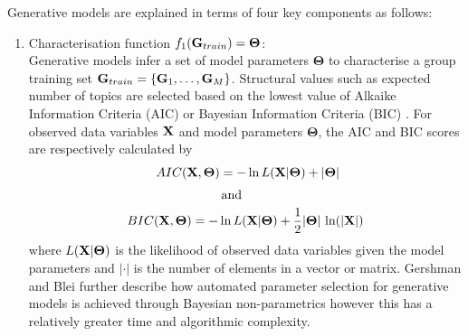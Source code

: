 Generative models are explained in terms of four key components as follows: %
\begin{enumerate}[1.]

\item Characterisation function $f_1({\bf G}_{train})= \boldsymbol\Theta$: \\   Generative models  infer a set of model parameters $\boldsymbol\Theta$   to characterise a group training set ${\bf G}_{train}=\{{\bf G}_{1},\dots,{\bf G}_{M}\}$. Structural values such as expected number of topics are selected based on the lowest value of Alkaike Information Criteria (AIC) \cite{AIC} 
 or Bayesian Information Criteria (BIC) \cite{BIC}. 
For observed data variables ${\bf X}$ and model parameters $\boldsymbol\Theta$, the
AIC and BIC scores are respectively calculated  by
\begin{align}%
& \hspace{8mm} AIC({\bf X}, \boldsymbol\Theta)=-\ln L({\bf X}| \boldsymbol\Theta)+|
\boldsymbol\Theta | \label{AIC} \\[1mm]
& \hspace{25mm}\mbox{ and} \nonumber \\ 
& BIC({\bf X}, \boldsymbol\Theta)=-\ln L({\bf X}| \boldsymbol\Theta)+\frac{1}{2}|
\boldsymbol\Theta|\, \ln (|{\bf X}|)\label{BIC}
\end{align}
where $L({\bf X}|\boldsymbol\Theta)$ is the likelihood of observed data variables given the model parameters and $|\cdot|$ is the number of elements in a  vector or matrix. 
Gershman and  Blei \cite{NPB} further describe how automated parameter selection for generative models is achieved through Bayesian non-parametrics however this has a relatively greater time and algorithmic  complexity. 
\end{enumerate}




 


  

 
 
